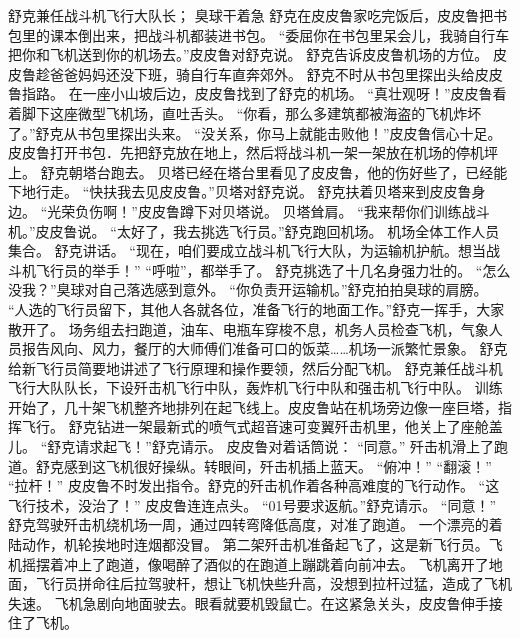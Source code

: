 \documentclass[a4paper,12pt,UTF8,twoside]{ctexbook}
\begin{document}
        舒克兼任战斗机飞行大队长； 
        臭球干着急   
        舒克在皮皮鲁家吃完饭后，皮皮鲁把书包里的课本倒出来，把战斗机都装进书包。 
        “委屈你在书包里呆会儿，我骑自行车把你和飞机送到你的机场去。”皮皮鲁对舒克说。 
        舒克告诉皮皮鲁机场的方位。 
        皮皮鲁趁爸爸妈妈还没下班，骑自行车直奔郊外。 
        舒克不时从书包里探出头给皮皮鲁指路。 
        在一座小山坡后边，皮皮鲁找到了舒克的机场。 
        “真壮观呀！”皮皮鲁看着脚下这座微型飞机场，直吐舌头。 
        “你看，那么多建筑都被海盗的飞机炸坏了。”舒克从书包里探出头来。 
        “没关系，你马上就能击败他！”皮皮鲁信心十足。 
        皮皮鲁打开书包．先把舒克放在地上，然后将战斗机一架一架放在机场的停机坪上。 
        舒克朝塔台跑去。 
        贝塔已经在塔台里看见了皮皮鲁，他的伤好些了，已经能下地行走。 
        “快扶我去见皮皮鲁。”贝塔对舒克说。 
        舒克扶着贝塔来到皮皮鲁身边。 
        “光荣负伤啊！”皮皮鲁蹲下对贝塔说。 
        贝塔耸肩。 
        “我来帮你们训练战斗机。”皮皮鲁说。 
        “太好了，我去挑选飞行员。”舒克跑回机场。 
        机场全体工作人员集合。 
        舒克讲话。 
        “现在，咱们要成立战斗机飞行大队，为运输机护航。想当战斗机飞行员的举手！” 
        “呼啦”，都举手了。 
        舒克挑选了十几名身强力壮的。 
        “怎么没我？”臭球对自己落选感到意外。 
        “你负责开运输机。”舒克拍拍臭球的肩膀。 
        “人选的飞行员留下，其他人各就各位，准备飞行的地面工作。”舒克一挥手，大家散开了。 
        场务组去扫跑道，油车、电瓶车穿梭不息，机务人员检查飞机，气象人员报告风向、风力，餐厅的大师傅们准备可口的饭菜……机场一派繁忙景象。 
        舒克给新飞行员简要地讲述了飞行原理和操作要领，然后分配飞机。 
        舒克兼任战斗机飞行大队队长，下设歼击机飞行中队，轰炸机飞行中队和强击机飞行中队。 
        训练开始了，几十架飞机整齐地排列在起飞线上。皮皮鲁站在机场旁边像一座巨塔，指挥飞行。 
        舒克钻进一架最新式的喷气式超音速可变翼歼击机里，他关上了座舱盖儿。 
        “舒克请求起飞！”舒克请示。 
        皮皮鲁对着话筒说：  “同意。” 
        歼击机滑上了跑道。舒克感到这飞机很好操纵。转眼间，歼击机插上蓝天。 
        “俯冲！” 
        “翻滚！” 
        “拉杆！” 
        皮皮鲁不时发出指令。舒克的歼击机作着各种高难度的飞行动作。 
        “这飞行技术，没治了！” 
        皮皮鲁连连点头。 
        “01号要求返航。”舒克请示。 
        “同意！” 
        舒克驾驶歼击机绕机场一周，通过四转弯降低高度，对准了跑道。 
        一个漂亮的着陆动作，机轮挨地时连烟都没冒。 
        第二架歼击机准备起飞了，这是新飞行员。飞机摇摆着冲上了跑道，像喝醉了酒似的在跑道上蹦跳着向前冲去。 
        飞机离开了地面，飞行员拼命往后拉驾驶杆，想让飞机快些升高，没想到拉杆过猛，造成了飞机失速。 
        飞机急剧向地面驶去。眼看就要机毁鼠亡。在这紧急关头，皮皮鲁伸手接住了飞机。 
\end{document}
